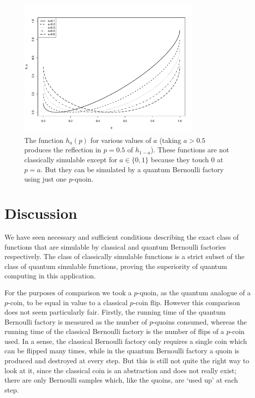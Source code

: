 \documentclass{article}
\theoremstyle{definition}
\begin{document}
\begin{figure}
\centering
\includegraphics[width=0.8\textwidth]{function_ha.pdf}
\caption{The function $h_a(p)$ for various values of $a$ (taking $a>0.5$ produces the reflection in $p=0.5$ of $h_{1-a}$). These functions are not classically simulable except for $a\in\{0,1\}$ because they touch 0 at $p=a$. But they can be simulated by a quantum Bernoulli factory using just one $p$-quoin.}
\label{fig:function_ha}
\end{figure}


\section{Discussion}\label{sec:discussion}
We have seen necessary and sufficient conditions describing the exact class of functions that are simulable by classical and quantum Bernoulli  factories respectively.
The class of classically simulable functions is a strict subset of the class of quantum simulable functions, proving the superiority of quantum computing in this application.

For the purposes of comparison we took a $p$-quoin, as the quantum analogue of a $p$-coin, to be equal in value to a classical $p$-coin flip.
However this comparison does not seem particularly fair. 
Firstly, the running time of the quantum Bernoulli factory is measured as the number of $p$-quoins consumed, whereas the running time of the classical Bernoulli factory is the number of flips of a $p$-coin used. In a sense, the classical Bernoulli factory only requires a single coin which can be flipped many times, while in the quantum Bernoulli factory a quoin is produced and destroyed at every step.
But this is still not quite the right way to look at it, since the classical coin is an abstraction and does not really exist; there are only Bernoulli samples which, like the quoins, are `used up' at each step.
\end{document}
